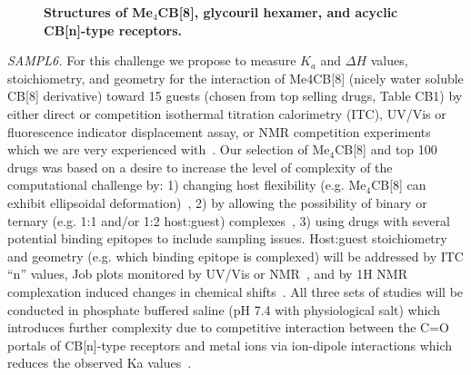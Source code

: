 \documentclass[11pt]{article}
\begin{document}
\begin{figure}[h]
\begin{centering}

\vspace{0.1in}
\caption{\footnotesize {\bf Structures of Me$_4$CB[8], glycouril hexamer, and acyclic CB[n]-type receptors.}
\label{figure:CB}}
\end{centering}
\end{figure}

\emph{SAMPL6.}  For this challenge we propose to measure $K_a$ and $\Delta H$ values, stoichiometry, and geometry for the interaction of Me4CB[8] (nicely water soluble CB[8] derivative) toward 15 guests (chosen from top selling drugs, Table CB1) by either direct or competition isothermal titration calorimetry (ITC), UV/Vis or fluorescence indicator displacement assay, or NMR competition experiments which we are very experienced with~\cite{cao_attomolar_2014, liu_cucurbituril_2005, ma_acyclic_2010, she_glycoluril-derived_2016}.  Our selection of Me$_4$CB[8] and top 100 drugs was based on a desire to increase the level of complexity of the computational challenge by: 1) changing host flexibility (e.g. Me$_4$CB[8] can exhibit ellipsoidal deformation)~\cite{vinciguerra_synthesis_2015}, 2) by allowing the possibility of binary or ternary (e.g. 1:1 and/or 1:2 host:guest) complexes~\cite{ko_supramolecular_2007, barrow_cucurbituril-based_2015, urbach_molecular_2011}, 3) using drugs with several potential binding epitopes to include sampling issues.  Host:guest stoichiometry and geometry (e.g. which binding epitope is complexed) will be addressed by ITC ``n'' values, Job plots monitored by UV/Vis or NMR~\cite{connors_binding_1987}, and by 1H NMR complexation induced changes in chemical shifts~\cite{masson_cucurbituril_2012}.  All three sets of studies will be conducted in phosphate buffered saline (pH 7.4 with physiological salt) which introduces further complexity due to competitive interaction between the C=O portals of CB[n]-type receptors and metal ions via ion-dipole interactions which reduces the observed Ka values~\cite{marquez_mechanism_2004}.
\end{document}
